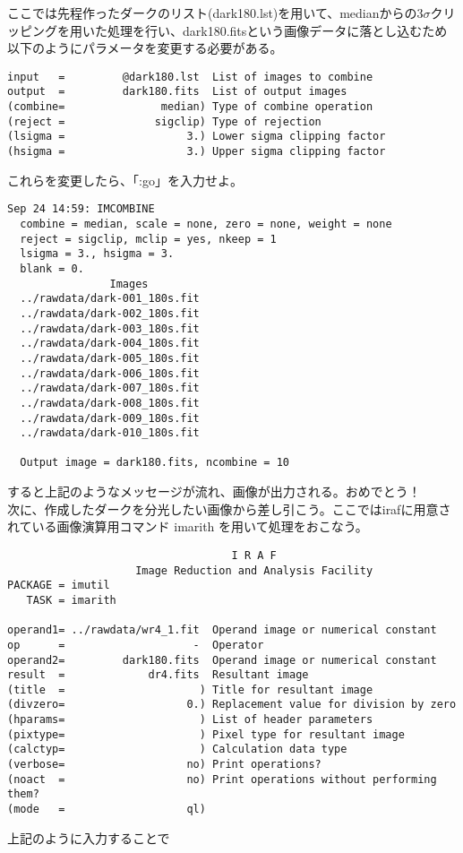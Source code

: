     ここでは先程作ったダークのリスト(dark180.lst)を用いて、medianからの3$\sigma$クリッピングを用いた処理を行い、dark180.fitsという画像データに落とし込むため以下のようにパラメータを変更する必要がある。
\begin{screen}
\begin{verbatim}
input   =         @dark180.lst  List of images to combine 
output  =         dark180.fits  List of output images
(combine=               median) Type of combine operation
(reject =              sigclip) Type of rejection
(lsigma =                   3.) Lower sigma clipping factor
(hsigma =                   3.) Upper sigma clipping factor
\end{verbatim}
\end{screen}
これらを変更したら、「:go」を入力せよ。
\begin{screen}
\small{
\begin{verbatim}
Sep 24 14:59: IMCOMBINE
  combine = median, scale = none, zero = none, weight = none
  reject = sigclip, mclip = yes, nkeep = 1
  lsigma = 3., hsigma = 3.
  blank = 0.
                Images 
  ../rawdata/dark-001_180s.fit
  ../rawdata/dark-002_180s.fit
  ../rawdata/dark-003_180s.fit
  ../rawdata/dark-004_180s.fit
  ../rawdata/dark-005_180s.fit
  ../rawdata/dark-006_180s.fit
  ../rawdata/dark-007_180s.fit
  ../rawdata/dark-008_180s.fit
  ../rawdata/dark-009_180s.fit
  ../rawdata/dark-010_180s.fit

  Output image = dark180.fits, ncombine = 10
\end{verbatim}
}
\end{screen}
    すると上記のようなメッセージが流れ、画像が出力される。おめでとう！\\
    次に、作成したダークを分光したい画像から差し引こう。ここではirafに用意されている画像演算用コマンド imarith を用いて処理をおこなう。
\begin{screen}
\small{
\begin{verbatim}
                                   I R A F  
                    Image Reduction and Analysis Facility
PACKAGE = imutil
   TASK = imarith

operand1= ../rawdata/wr4_1.fit  Operand image or numerical constant
op      =                    -  Operator
operand2=         dark180.fits  Operand image or numerical constant
result  =             dr4.fits  Resultant image
(title  =                     ) Title for resultant image
(divzero=                   0.) Replacement value for division by zero
(hparams=                     ) List of header parameters
(pixtype=                     ) Pixel type for resultant image
(calctyp=                     ) Calculation data type
(verbose=                   no) Print operations?
(noact  =                   no) Print operations without performing them?
(mode   =                   ql)
\end{verbatim}
}
\end{screen}
    上記のように入力することで
    
